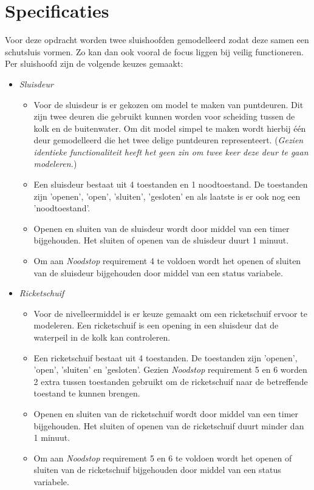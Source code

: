\documentclass{article}
\begin{document}
\section {Specificaties}
    Voor deze opdracht worden twee sluishoofden gemodelleerd zodat deze 
    samen een schutsluis vormen. Zo kan dan ook vooral de focus liggen bij 
    veilig functioneren. Per sluishoofd zijn de volgende keuzes gemaakt: \\
    \begin{itemize}
        \item \textit{Sluisdeur}
        \begin{itemize}
            \item Voor de sluisdeur is er gekozen om model te maken van puntdeuren.
            Dit zijn twee deuren die gebruikt kunnen worden voor scheiding tussen 
            de kolk en de buitenwater. Om dit model simpel te maken wordt hierbij 
            één deur gemodelleerd die het twee delige puntdeuren representeert.
            (\textit{Gezien identieke functionaliteit heeft het geen zin om twee 
            keer deze deur te gaan modeleren.})
            \item Een sluisdeur bestaat uit 4 toestanden en 1 noodtoestand.
            De toestanden zijn 'openen', 'open', 'sluiten', 'gesloten' en als
            laatste is er ook nog een 'noodtoestand'.
            \item Openen en sluiten van de sluisdeur wordt door middel van een timer
            bijgehouden. Het sluiten of openen van de sluisdeur duurt 1 minuut.
            \item Om aan \textit{Noodstop} requirement 4 te voldoen wordt het openen
            of sluiten van de sluisdeur bijgehouden door middel van een status variabele.
        \end{itemize}
        
        \item \textit{Ricketschuif}
        \begin{itemize}
            \item Voor de nivelleermiddel is er keuze gemaakt om een ricketschuif
            ervoor te modeleren. Een ricketschuif is een opening in een sluisdeur
            dat de waterpeil in de kolk kan controleren.
            \item Een ricketschuif bestaat uit 4 toestanden. De toestanden zijn 'openen', 
            'open', 'sluiten' en 'gesloten'. Gezien \textit{Noodstop} requirement 5 en 6
            worden 2 extra tussen toestanden gebruikt om de ricketschuif naar de betreffende
            toestand te kunnen brengen.
            \item Openen en sluiten van de ricketschuif wordt door middel van een timer
            bijgehouden. Het sluiten of openen van de ricketschuif duurt minder dan 1 minuut.
            \item Om aan \textit{Noodstop} requirement 5 en 6 te voldoen wordt het openen
            of sluiten van de ricketschuif bijgehouden door middel van een status variabele.
        \end{itemize}


\end{itemize}
\end{document}
